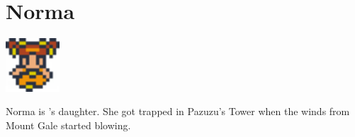 \section{Norma}
\label{char:norma}

\includegraphics[height=2cm,keepaspectratio]{./resources/chars/norma}

Norma is ’s daughter. She got trapped in Pazuzu’s Tower when the winds from Mount Gale started blowing.

